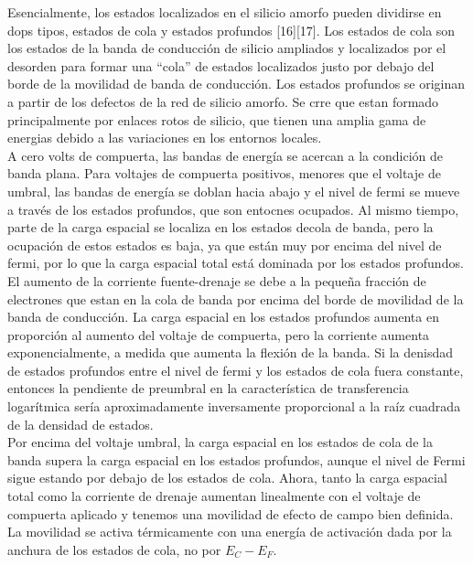 \documentclass[conference]{IEEEtran}
\begin{document}
    Esencialmente, los estados localizados en el silicio amorfo pueden dividirse en dops tipos, 
    estados de cola y estados profundos [16][17]. Los estados de cola son  los estados de la banda de 
    conducción de silicio ampliados y localizados por el desorden para formar una ``cola'' de estados
    localizados justo por debajo del borde de la movilidad de banda de conducción. Los estados profundos
    se originan a partir de los defectos de la red de silicio amorfo. Se crre que estan formado principalmente 
    por enlaces rotos de silicio, que tienen una amplia gama de energias debido a las variaciones en los 
    entornos locales. 
    \\
    A cero volts de compuerta, las bandas de energía se acercan a la condición de banda plana. Para
    voltajes de compuerta positivos, menores que el voltaje de umbral, las   bandas de energía se 
    doblan hacia abajo y el nivel de fermi se mueve a través de los estados profundos, que son entocnes
    ocupados. Al mismo tiempo, parte de la carga espacial se localiza en los estados decola de banda, 
    pero la ocupación de estos estados es baja, ya que están muy por encima del nivel de fermi, 
    por lo que la carga espacial total está dominada por los estados profundos.
    \\
    El aumento de la corriente fuente-drenaje se debe a la pequeña fracción de electrones que 
    estan en la cola de banda por encima del borde de movilidad de la banda de conducción. 
    La carga espacial en los estados profundos aumenta en proporción al aumento del voltaje de compuerta,
    pero la corriente aumenta exponencialmente, a medida que aumenta la flexión de la banda. 
    Si la denisdad de estados profundos entre el nivel de fermi y los estados de cola fuera constante, entonces
    la pendiente de preumbral en la característica de transferencia logarítmica sería aproximadamente
    inversamente proporcional a la raíz cuadrada de la densidad de estados.
    \\
    Por encima del voltaje umbral, la carga espacial en los estados de cola de la banda supera la 
    carga espacial en los estados profundos, aunque el nivel de Fermi sigue estando por debajo de 
    los estados de cola. Ahora, tanto la carga espacial total como la corriente de drenaje aumentan 
    linealmente con el voltaje de compuerta aplicado y tenemos una movilidad de efecto de campo 
    bien definida. La movilidad se activa térmicamente con una energía de activación dada por 
    la anchura de los estados de cola, no por $E_C - E_F$.
    \\
\end{document}
